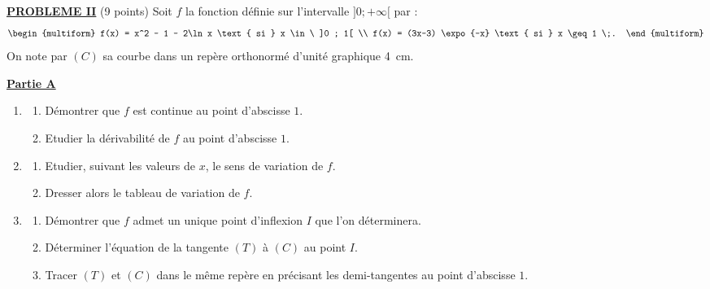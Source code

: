 \noindent \underline{\textsc{\textbf{PROBLEME II}}} (9 points) \newline
%
      Soit $f$ la fonction d\'efinie sur l'intervalle $]0 ; +\infty[$ par :
      \[
            \begin{multiform}
                  f(x) = x^2 - 1 - 2\ln x  \text{ si }  x \in\ ]0 ; 1[ \\
                  f(x) = (3x-3) \expo{-x}  \text{ si }  x \geq 1      \;.
            \end{multiform}
      \]
      On note par $(C)$ sa courbe dans un rep\`ere orthonorm\'e d'unit\'e graphique 4~cm.
      
      \underline{\textbf{Partie A}} %
            \begin{enumerate}
                  \item \begin{enumerate}
                              \item D\'emontrer que $f$ est continue au point d'abscisse $1$.
                              \item Etudier la d\'erivabilit\'e de $f$ au point d'abscisse $1$.
                        \end{enumerate}
                  \item \begin{enumerate}
                              \item Etudier, suivant les valeurs de $x$, le sens de variation de $f$.
                              \item Dresser alors le tableau de variation de $f$.
                        \end{enumerate}
                  \item \begin{enumerate}
                              \item D\'emontrer que $f$ admet un unique point d'inflexion $I$ que l'on d\'eterminera.
                              \item D\'eterminer l'\'equation de la tangente $(T)$ \`a $(C)$ au point $I$.
                              \item Tracer $(T)$ et $(C)$ dans le m\^eme rep\`ere 
                                    en pr\'ecisant les demi-tangentes au point d'abscisse $1$.
                        \end{enumerate}
            \end{enumerate}
            
